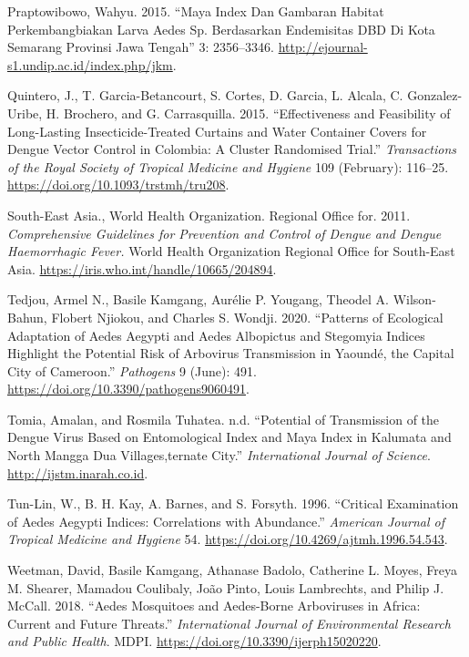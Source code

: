 \documentclass[
  letterpaper,
  twocolumn,
  landscape]{report}
\newlength{\cslhangindent}
\newenvironment{CSLReferences}[2] %
 {\begin{list}{}{%
  \setlength{\itemindent}{0pt}
  \setlength{\leftmargin}{0pt}
  \setlength{\parsep}{0pt}
  \ifodd #1
   \setlength{\leftmargin}{\cslhangindent}
   \setlength{\itemindent}{-1\cslhangindent}
  \fi
  \setlength{\itemsep}{#2\baselineskip}}}
 {\end{list}}
\begin{document}
\begin{CSLReferences}{1}{0}
Praptowibowo, Wahyu. 2015. {``Maya Index Dan Gambaran Habitat
Perkembangbiakan Larva Aedes Sp. Berdasarkan Endemisitas DBD Di Kota
Semarang Provinsi Jawa Tengah''} 3: 2356--3346.
\url{http://ejournal-s1.undip.ac.id/index.php/jkm}.

Quintero, J., T. Garcia-Betancourt, S. Cortes, D. Garcia, L. Alcala, C.
Gonzalez-Uribe, H. Brochero, and G. Carrasquilla. 2015. {``Effectiveness
and Feasibility of Long-Lasting Insecticide-Treated Curtains and Water
Container Covers for Dengue Vector Control in Colombia: A Cluster
Randomised Trial.''} \emph{Transactions of the Royal Society of Tropical
Medicine and Hygiene} 109 (February): 116--25.
\url{https://doi.org/10.1093/trstmh/tru208}.

South-East Asia., World Health Organization. Regional Office for. 2011.
\emph{Comprehensive Guidelines for Prevention and Control of Dengue and
Dengue Haemorrhagic Fever.} World Health Organization Regional Office
for South-East Asia. \url{https://iris.who.int/handle/10665/204894}.

Tedjou, Armel N., Basile Kamgang, Aurélie P. Yougang, Theodel A.
Wilson-Bahun, Flobert Njiokou, and Charles S. Wondji. 2020. {``Patterns
of Ecological Adaptation of Aedes Aegypti and Aedes Albopictus and
Stegomyia Indices Highlight the Potential Risk of Arbovirus Transmission
in Yaoundé, the Capital City of Cameroon.''} \emph{Pathogens} 9 (June):
491. \url{https://doi.org/10.3390/pathogens9060491}.

Tomia, Amalan, and Rosmila Tuhatea. n.d. {``Potential of Transmission of
the Dengue Virus Based on Entomological Index and Maya Index in Kalumata
and North Mangga Dua Villages,ternate City.''} \emph{International
Journal of Science}. \url{http://ijstm.inarah.co.id}.

Tun-Lin, W., B. H. Kay, A. Barnes, and S. Forsyth. 1996. {``Critical
Examination of Aedes Aegypti Indices: Correlations with Abundance.''}
\emph{American Journal of Tropical Medicine and Hygiene} 54.
\url{https://doi.org/10.4269/ajtmh.1996.54.543}.

Weetman, David, Basile Kamgang, Athanase Badolo, Catherine L. Moyes,
Freya M. Shearer, Mamadou Coulibaly, João Pinto, Louis Lambrechts, and
Philip J. McCall. 2018. {``Aedes Mosquitoes and Aedes-Borne Arboviruses
in Africa: Current and Future Threats.''} \emph{International Journal of
Environmental Research and Public Health}. MDPI.
\url{https://doi.org/10.3390/ijerph15020220}.

\end{CSLReferences}
\end{document}
